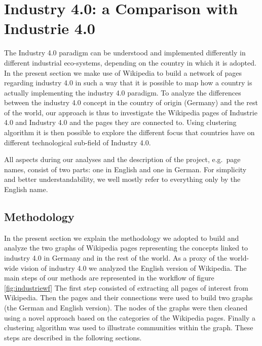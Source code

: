 \documentclass[b5paper,]{book}
\theoremstyle{definition}
\theoremstyle{definition}
\theoremstyle{definition}
\theoremstyle{remark}
\begin{document}
\section{Industry 4.0: a Comparison with Industrie
4.0}\label{industry-4.0-a-comparison-with-industrie-4.0}

The Industry 4.0 paradigm can be understood and implemented differently
in different industrial eco-systems, depending on the country in which
it is adopted. In the present section we make use of Wikipedia to build
a network of pages regarding industry 4.0 in such a way that it is
possible to map how a country is actually implementing the industry 4.0
paradigm. To analyze the differences between the industry 4.0 concept in
the country of origin (Germany) and the rest of the world, our approach
is thus to investigate the Wikipedia pages of Industrie 4.0 and Industry
4.0 and the pages they are connected to. Using clustering algorithm it
is then possible to explore the different focus that countries have on
different technological sub-field of Industry 4.0.

All aspects during our analyses and the description of the project,
e.g.~page names, consist of two parts: one in English and one in German.
For simplicity and better understandability, we well mostly refer to
everything only by the English name.

\subsection{Methodology}\label{methodology-7}

In the present section we explain the methodology we adopted to build
and analyze the two graphs of Wikipedia pages representing the concepts
linked to industry 4.0 in Germany and in the rest of the world. As a
proxy of the world-wide vision of industry 4.0 we analyzed the English
version of Wikipedia. The main steps of our methods are represented in
the workflow of figure \ref{fig:industriewf} The first step consisted of
extracting all pages of interest from Wikipedia. Then the pages and
their connections were used to build two graphs (the German and English
version). The nodes of the graphs were then cleaned using a novel
approach based on the categories of the Wikipedia pages. Finally a
clustering algorithm was used to illustrate communities within the
graph. These steps are described in the following sections.
\end{document}
